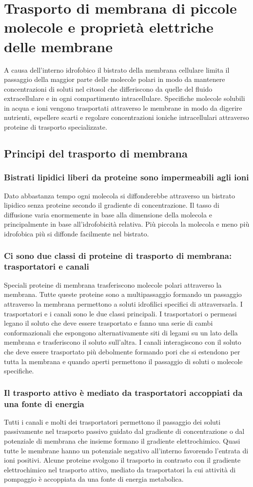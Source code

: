 \chapter{Trasporto di membrana di piccole molecole e propriet\`a elettriche delle membrane}
A causa dell'interno idrofobico il bistrato della membrana cellulare limita il passaggio della maggior parte delle molecole polari in modo da mantenere
concentrazioni di soluti nel citosol che differiscono da quelle del fluido extracellulare e in ogni compartimento intracellulare. Specifiche molecole solubili in acqua e ioni vengono
trasportati attraverso le membrane in modo da digerire nutrienti, espellere scarti e regolare concentrazioni ioniche intracellulari attraverso proteine di trasporto specializzate. 
\section{Principi del trasporto di membrana}
\subsection{Bistrati lipidici liberi da proteine sono impermeabili agli ioni}
Dato abbastanza tempo ogni molecola si diffonderebbe attraverso un bistrato lipidico senza proteine secondo il gradiente di concentrazione. Il tasso di diffusione varia enormemente in 
base alla dimensione della molecola e principalmente in base all'idrofobicit\`a relativa. Pi\`u piccola la molecola e meno pi\`u idrofobica pi\`u si diffonde facilmente nel bistrato.
\subsection{Ci sono due classi di proteine di trasporto di membrana: trasportatori e canali}
Speciali proteine di membrana trasferiscono molecole polari attraverso la membrana. Tutte queste proteine sono a multipassaggio formando un passaggio attraverso la membrana permettono a
soluti idrofilici specifici di attraversarla. I trasportatori e i canali sono le due classi principali. I trasportatori o permeasi legano il soluto che deve essere trasportato e fanno 
una serie di cambi conformazionali che espongono alternativamente siti di legami su un lato della membrana e trasferiscono il soluto sull'altra. I canali interagiscono con il soluto 
che deve essere trasportato pi\`u debolmente formando pori che si estendono per tutta la membrana e quando aperti permettono il passaggio di soluti o molecole specifiche. 
\subsection{Il trasporto attivo \`e mediato da trasportatori accoppiati da una fonte di energia}
Tutti i canali e molti dei trasportatori permettono il passaggio dei soluti passivamente nel trasporto passivo guidato dal gradiente di concentrazione o dal potenziale di membrana che
insieme formano il gradiente elettrochimico. Quasi tutte le membrane hanno un potenziale negativo all'interno favorendo l'entrata di ioni positivi. Alcune proteine svolgono il trasporto
in contrasto con il gradiente elettrochimico nel trasporto attivo, mediato da trasportatori la cui attivit\`a di pompaggio \`e accoppiata da una fonte di energia metabolica. 
